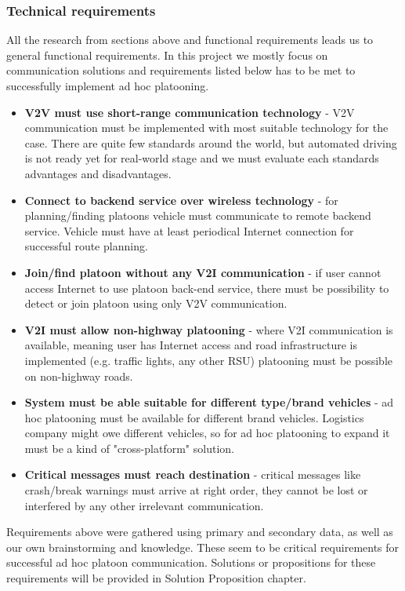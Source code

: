 \subsubsection{Technical requirements}
%
All the research from sections above and functional requirements leads us to general functional requirements. In this project we mostly focus on communication solutions and requirements listed below has to be met to successfully implement ad hoc platooning.
%
\begin{itemize}
    \item\textbf{V2V must use short-range communication technology} - V2V communication must be implemented with most suitable technology for the case. There are quite few standards around the world, but automated driving is not ready yet for real-world stage and we must evaluate each standards advantages and disadvantages.
    \item\textbf{Connect to backend service over wireless technology} - for planning/finding platoons vehicle must communicate to remote backend service. Vehicle must have at least periodical Internet connection for successful route planning.
    \item\textbf{Join/find platoon without any V2I communication} - if user cannot access Internet to use platoon back-end service, there must be possibility to detect or join platoon using only V2V communication.
    \item\textbf{V2I must allow non-highway platooning} - where V2I communication is available, meaning user has Internet access and road infrastructure is implemented (e.g. traffic lights, any other RSU) platooning must be possible on non-highway roads. 
    \item\textbf{System must be able suitable for different type/brand vehicles} - ad hoc platooning must be available for different brand vehicles. Logistics company might owe different vehicles, so for ad hoc platooning to expand it must be a kind of "cross-platform" solution.
    \item\textbf{Critical messages must reach destination} - critical messages like crash/break warnings must arrive at right order, they cannot be lost or interfered by any other irrelevant communication.
\end{itemize}\par
%
Requirements above were gathered using primary and secondary data, as well as our own brainstorming and knowledge. These seem to be critical requirements for successful ad hoc platoon communication. Solutions or propositions for these requirements will be provided in Solution Proposition chapter.

